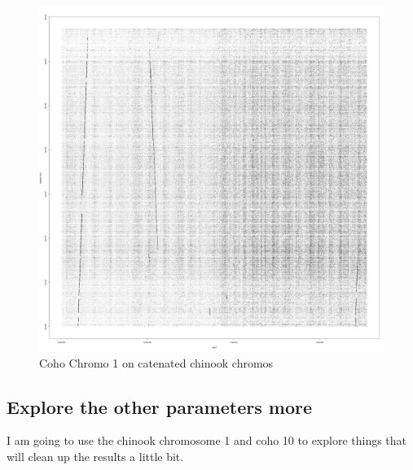\documentclass[]{krantz}
\makeatletter
\newenvironment{Shaded}{\begin{snugshade}}{\end{snugshade}}
\newcommand{\BuiltInTok}[1]{#1}
\newcommand{\CommentTok}[1]{\textcolor[rgb]{0.37,0.37,0.37}{\textit{#1}}}
\newcommand{\ExtensionTok}[1]{#1}
\newcommand{\KeywordTok}[1]{\textcolor[rgb]{0.27,0.27,0.27}{\textbf{#1}}}
\newcommand{\NormalTok}[1]{#1}
\newcommand{\OperatorTok}[1]{\textcolor[rgb]{0.43,0.43,0.43}{\textbf{#1}}}
\newcommand{\VariableTok}[1]{\textcolor[rgb]{0,0,0}{#1}}
\newenvironment{kframe}{%
\medskip{}
\setlength{\fboxsep}{.8em}
 \def\at@end@of@kframe{}%
 \ifinner\ifhmode%
  \def\at@end@of@kframe{\end{minipage}}%
  \begin{minipage}{\columnwidth}%
 \fi\fi%
 \def\FrameCommand##1{\hskip\@totalleftmargin \hskip-\fboxsep
 \colorbox{shadecolor}{##1}\hskip-\fboxsep
     \hskip-\linewidth \hskip-\@totalleftmargin \hskip\columnwidth}%
 \MakeFramed {\advance\hsize-\width
   \@totalleftmargin\z@ \linewidth\hsize
   \@setminipage}}%
 {\par\unskip\endMakeFramed%
 \at@end@of@kframe}
\renewenvironment{Shaded}{\begin{kframe}}{\end{kframe}}
\makeatother
\begin{document}
\begin{figure}
\centering
\includegraphics{figs/quickie.jpg}
\caption{Coho Chromo 1 on catenated chinook chromos}
\end{figure}

\hypertarget{explore-the-other-parameters-more}{%
\subsection{Explore the other parameters more}\label{explore-the-other-parameters-more}}

I am going to use the chinook chromosome 1 and coho 10 to explore things that will
clean up the results a little bit.

\begin{Shaded}
\end{Shaded}
\end{document}
